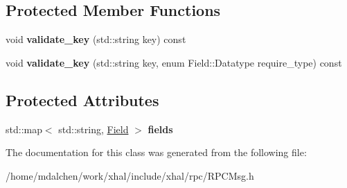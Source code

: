 \subsection*{Protected Member Functions}
\begin{DoxyCompactItemize}
\item 
\hypertarget{classRPCMsg_a4d9c14b34d94f6a15892083e65ad1d00}{
void {\bfseries validate\_\-key} (std::string key) const }
\label{classRPCMsg_a4d9c14b34d94f6a15892083e65ad1d00}

\item 
\hypertarget{classRPCMsg_a0fec82739ebce74ce1d227235d682776}{
void {\bfseries validate\_\-key} (std::string key, enum Field::Datatype require\_\-type) const }
\label{classRPCMsg_a0fec82739ebce74ce1d227235d682776}

\end{DoxyCompactItemize}
\subsection*{Protected Attributes}
\begin{DoxyCompactItemize}
\item 
\hypertarget{classRPCMsg_a492f2f6365ccdd49c2be17d2a2b9e055}{
std::map$<$ std::string, \hyperlink{classRPCMsg_1_1Field}{Field} $>$ {\bfseries fields}}
\label{classRPCMsg_a492f2f6365ccdd49c2be17d2a2b9e055}

\end{DoxyCompactItemize}


The documentation for this class was generated from the following file:\begin{DoxyCompactItemize}
\item 
/home/mdalchen/work/xhal/include/xhal/rpc/RPCMsg.h\end{DoxyCompactItemize}
